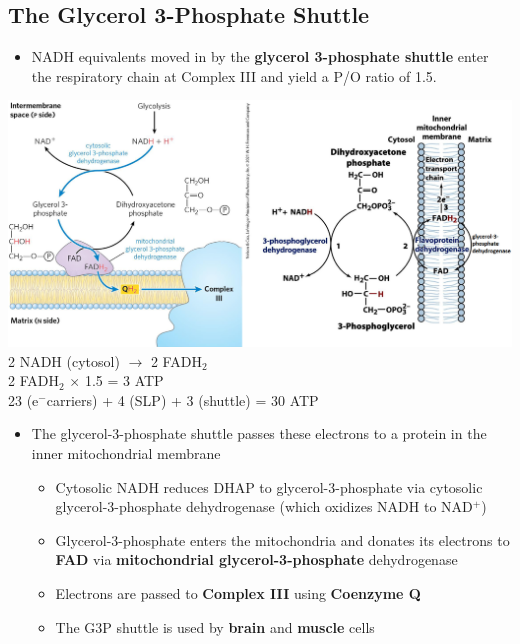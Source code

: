 \documentclass[10pt]{article}
\newcommand{\pc}{$^+$}
\newcommand{\nc}{$^-$}
\begin{document}
\subsection*{The Glycerol 3-Phosphate Shuttle}
\begin{itemize}
	\item NADH equivalents moved in by the \textbf{glycerol 3-phosphate shuttle} enter the respiratory chain at Complex III and yield a P/O ratio of 1.5.
\end{itemize}
\begin{center} 
	\includegraphics*[width=\textwidth]{L3_16.png}
    2 NADH (cytosol) $\rightarrow$ 2 FADH$_2$\\
    2 FADH$_2$ $\times$ 1.5 = 3 ATP\\
    23 (e\nc carriers) + 4 (SLP) + 3 (shuttle) = 30 ATP
\end{center}
\begin{itemize}
	\item The glycerol-3-phosphate shuttle passes these electrons to a protein in the inner mitochondrial membrane
	\begin{itemize}
        \item Cytosolic NADH reduces DHAP to glycerol-3-phosphate via cytosolic glycerol-3-phosphate dehydrogenase (which oxidizes NADH to NAD\pc)
        \item Glycerol-3-phosphate enters the mitochondria and donates its electrons to \textbf{FAD} via \textbf{mitochondrial glycerol-3-phosphate} dehydrogenase
        \item Electrons are passed to \textbf{Complex III} using \textbf{Coenzyme Q}
        \item The G3P shuttle is used by \textbf{brain} and \textbf{muscle} cells
    \end{itemize}
\end{itemize}
\end{document}
